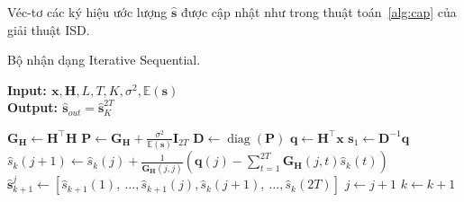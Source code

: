 Véc-tơ các ký hiệu ước lượng $\hat{\mathbf{s}}$ được cập nhật như trong thuật toán~\ref{alg:cap} của giải thuật ISD. 
\begin{algorithm}[ht]
    \caption{Bộ nhận dạng Iterative Sequential.}\label{alg:cap}
    \hspace*{\algorithmicindent} \textbf{Input: $\mathbf{x}, \mathbf{H}, L, T, K, \sigma^2, \mathbb{E}(\mathbf{s})$} \\
    \hspace*{\algorithmicindent} \textbf{Output: $\hat{\mathbf{s}}_{out} = \hat{\mathbf{s}}^{2T}_K$} 
    \begin{algorithmic}[1]
        \State $\mathbf{G}_\mathbf{H} \leftarrow \mathbf{H}^\top \mathbf{H}$
        \State $\mathbf{P} \leftarrow \mathbf{G}_\mathbf{H} + \frac{\sigma^2}{\mathbb{E}(\mathbf{s})} \mathbf{I}_{2T}$
        \State $\mathbf{D} \leftarrow \operatorname{diag}(\mathbf{P})$
        \State $\mathbf{q} \leftarrow \mathbf{H}^\top \mathbf{x}$
        \State $\mathbf{s}_1 \leftarrow \mathbf{D}^{-1} \mathbf{q}$ \\
                \State $\hat{s}_k(j+1) \leftarrow \hat{s}_k(j)+\frac{1}{\mathbf{G}_\mathbf{H}(j, j)}\left(\mathbf{q}(j)-\sum_{t=1}^{2T} \mathbf{G}_\mathbf{H}(j, t) \hat{s}_k(t)\right)$ \\ 
                \State $\hat{\mathbf{s}}_{k+1}^j \leftarrow\left[\hat{s}_{k+1}(1),~\ldots, \hat{s}_{k+1}(j), \hat{s}_k(j+1),~\ldots, \hat{s}_k(2T)\right]$
                \State $j \leftarrow j + 1$
            \EndFor
            \State $k \leftarrow k + 1$
        \EndFor
    \end{algorithmic}
\end{algorithm}

